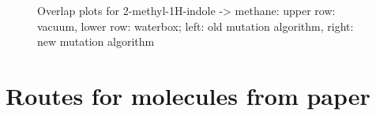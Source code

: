 \begin{figure}[h]
	\hfil
	
	\caption{Overlap plots for 2-methyl-1H-indole -> methane: upper row: vacuum, lower row: waterbox; left: old mutation algorithm, right: new mutation algorithm}
	\label{fig:methylindole_overlaps}
\end{figure}


\section{Routes for molecules from {\trafo} paper}

